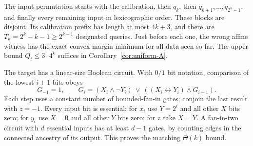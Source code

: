 The input permutation starts with the calibration, then $q_k$, then
$q_{k+1},\ldots,q_{2^k-1}$, and finally every remaining input in
lexicographic order. These blocks are disjoint. Its calibration prefix
has length at most $4k+3$, and there are
$T_k=2^k-k-1\ge2^{k-1}$ designated queries. Just before each one, the
wrong affine witness has the exact convex margin minimum for all data
seen so far. The upper bound $Q_t\le3\cdot4^k$ suffices in
Corollary~\ref{cor:uniform-A}.

The target has a linear-size Boolean circuit. With $0/1$ bit notation,
comparison of the lowest $i+1$ bits obeys
\[
 G_{-1}=1,\qquad
 G_i=(X_i\wedge\neg Y_i)\ \vee\
       ((X_i\leftrightarrow Y_i)\wedge G_{i-1}).
\]
Each step uses a constant number of bounded-fan-in gates; conjoin the
last result with $z=-1$. Every input bit is essential: for $x_i$ use
$Y=2^i$ and all other $X$ bits zero; for $y_i$ use $X=0$ and all other
$Y$ bits zero; for $z$ take $X=Y$. A fan-in-two circuit with $d$ essential
inputs has at least $d-1$ gates, by counting edges in the connected
ancestry of its output. This proves the matching $\Theta(k)$ bound.
